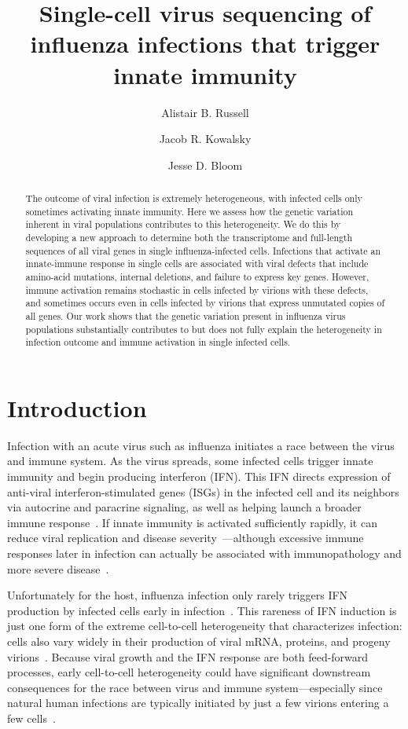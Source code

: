 \documentclass[9pt,lineno]{elife}
\title{Single-cell virus sequencing of influenza infections that trigger innate immunity}
\author[1]{Alistair B. Russell}
\author[1]{Jacob R. Kowalsky}
\author[1,2,3*]{Jesse D. Bloom}
\affil[1]{Basic Sciences Division and Computational Biology Program, Fred Hutchinson Cancer Research Center, Seattle, United States}
\affil[2]{Department of Genome Sciences, University of Washington, Seattle, United States}
\affil[3]{Howard Hughes Medical Institute, Fred Hutchinson Cancer Research Center, Seattle, United States}
\begin{document}
\maketitle

\begin{abstract}
The outcome of viral infection is extremely heterogeneous, with infected cells only sometimes activating innate immunity.  
Here we assess how the genetic variation inherent in viral populations contributes to this heterogeneity.
We do this by developing a new approach to determine both the transcriptome and full-length sequences of all viral genes in single influenza-infected cells.
Infections that activate an innate-immune response in single cells are associated with viral defects that include amino-acid mutations, internal deletions, and failure to express key genes.  
However, immune activation remains stochastic in cells infected by virions with these defects, and sometimes occurs even in cells infected by virions that express unmutated copies of all genes.
Our work shows that the genetic variation present in influenza virus populations substantially contributes to but does not fully explain the heterogeneity in infection outcome and immune activation in single infected cells.
\end{abstract}


\section{Introduction}
Infection with an acute virus such as influenza initiates a race between the virus and immune system.
As the virus spreads, some infected cells trigger innate immunity and begin producing interferon (IFN).
This IFN directs expression of anti-viral interferon-stimulated genes (ISGs) in the infected cell and its neighbors via autocrine and paracrine signaling, as well as helping launch a broader immune response~\citep{stetson2006type,honda2006type}.
If innate immunity is activated sufficiently rapidly, it can reduce viral replication and disease severity~\citep{solov1969results,treanor1987intranasally,beilharz2007protection,kugel2009intranasal,steel2010transmission}---although excessive immune responses later in infection can actually be associated with immunopathology and more severe disease~\citep{la2007question, iwasaki2014innate}.

Unfortunately for the host, influenza infection only rarely triggers IFN production by infected cells early in infection~\citep{kallfass2013visualizing, killip2017single}.
This rareness of IFN induction is just one form of the extreme cell-to-cell heterogeneity that characterizes infection: cells also vary widely in their production of viral mRNA, proteins, and progeny virions~\citep{russell2018extreme,steuerman2018dissection,sjaastad2018distinct,heldt2015single}.
Because viral growth and the IFN response are both feed-forward processes, early cell-to-cell heterogeneity could have significant downstream consequences for the race between virus and immune system---especially since natural human infections are typically initiated by just a few virions entering a few cells~\citep{mccrone2018stochastic, xue2018reconciling, varble2014influenza}.
\end{document}
